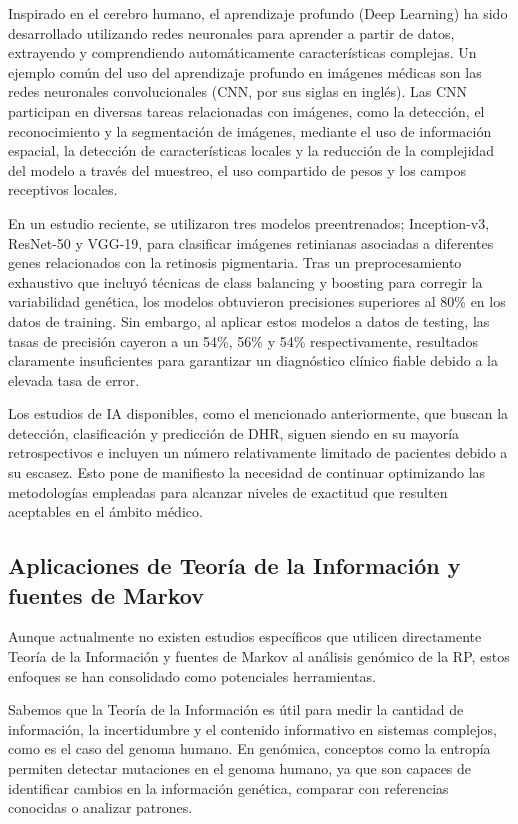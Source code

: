 \documentclass[11pt,spanish,listoffigures,listoftables]{tfgetsinf}
\begin{document}
Inspirado en el cerebro humano, el aprendizaje profundo (Deep Learning) ha sido desarrollado utilizando redes neuronales para aprender a partir de datos, extrayendo y comprendiendo automáticamente características complejas. Un ejemplo común del uso del aprendizaje profundo en imágenes médicas son las redes neuronales convolucionales (\acs{CNN}, por sus siglas en inglés). Las \acs{CNN} participan en diversas tareas relacionadas con imágenes, como la detección, el reconocimiento y la segmentación de imágenes, mediante el uso de información espacial, la detección de características locales y la reducción de la complejidad del modelo a través del muestreo, el uso compartido de pesos y los campos receptivos locales\cite{SHE}.

En un estudio reciente, se utilizaron tres modelos preentrenados; Inception-v3, ResNet-50 y VGG-19, para clasificar imágenes retinianas asociadas a diferentes genes relacionados con la retinosis pigmentaria. Tras un preprocesamiento exhaustivo que incluyó técnicas de class balancing y boosting para corregir la variabilidad genética, los modelos obtuvieron precisiones superiores al 80\% en los datos de training\cite{FER}. Sin embargo, al aplicar estos modelos a datos de testing, las tasas de precisión cayeron a un 54\%, 56\% y 54\% respectivamente, resultados claramente insuficientes para garantizar un diagnóstico clínico fiable debido a la elevada tasa de error.

Los estudios de \acs{IA} disponibles, como el mencionado anteriormente, que buscan la detección, clasificación y predicción de \acs{DHR}, siguen siendo en su mayoría retrospectivos e incluyen un número relativamente limitado de pacientes debido a su escasez\cite{ISS}. Esto pone de manifiesto la necesidad de continuar optimizando las metodologías empleadas para alcanzar niveles de exactitud que resulten aceptables en el ámbito médico.

\subsection{Aplicaciones de Teoría de la Información y fuentes de Markov}

Aunque actualmente no existen estudios específicos que utilicen directamente Teoría de la Información y fuentes de Markov al análisis genómico de la \acs{RP}, estos enfoques se han consolidado como potenciales herramientas.

Sabemos que la Teoría de la Información es útil para medir la cantidad de información, la incertidumbre y el contenido informativo en sistemas complejos, como es el caso del genoma humano. En genómica, conceptos como la entropía permiten detectar mutaciones en el genoma humano, ya que son capaces de identificar cambios en la información genética, comparar con referencias conocidas o analizar patrones\cite{SEC}.
\end{document}
